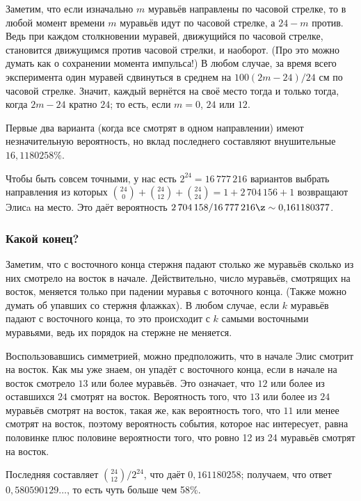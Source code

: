 Заметим, что если изначально $m$ муравьёв направлены по часовой стрелке, то в любой момент времени $m$ муравьёв идут по часовой стрелке, а $24 - m$ против.
Ведь при каждом столкновении муравей, движущийся по часовой стрелке, становится движущимся против часовой стрелки, и наоборот.
(Про это можно думать как о сохранении момента импульса!)
В любом случае, за время всего эксперимента один муравей сдвинуться в среднем на $100(2m - 24)/24$ см по часовой стрелке.
Значит, каждый вернётся на своё место тогда и только тогда, когда $2m - 24$ кратно $24$; то есть, если $m = 0$, $24$ или $12$.

Первые два варианта (когда все смотрят в одном направлении) имеют незначительную вероятность, но вклад последнего составляют внушительные $16{,}1180258\%$. %

Чтобы быть совсем точными, у нас есть $2^{24}=16\,777\,216$ вариантов выбрать направления из которых  $\binom{24}0+\binom{24}{12}+\binom{24}{24}=1+2\,704\,156+1$ возвращают Элисa на место.
Это даёт вероятность $2\,704\,158/16\,777\,216 \z\sim 0{,}161180377$.

\subsubsection*{Какой конец?}

Заметим, что с восточного конца стержня падают столько же муравьёв сколько из них смотрело на восток в начале.
Действительно, число муравьёв, смотрящих на восток, меняется только при падении муравья с воточного конца.
(Также можно думать об упавших со стержня флажках).
В любом случае, если $k$ муравьёв падают с восточного конца, то это происходит с $k$ самыми восточными муравьями, ведь их порядок на стержне не меняется.

Воспользовавшись симметрией, можно предположить, что в начале Элис смотрит на восток.
Как мы уже знаем, он упадёт с восточного конца, если в начале на восток смотрело $13$ или более муравьёв.
Это означает, что $12$ или более из оставшихся $24$ смотрят на восток.
Вероятность того, что $13$ или более из $24$ муравьёв смотрят на восток, такая же, как вероятность того, что $11$ или менее смотрят на восток, поэтому вероятность события, которое нас интересует, равна половинке плюс половине вероятности того, что ровно 12 из
24 муравьёв смотрят на восток.

Последняя составляет $\binom{24}{12}/2^{24}$, что даёт $0{,}161180258$;
получаем, что ответ $0{,}580590129\dots$, то есть чуть больше чем 58\%.

